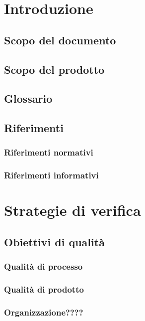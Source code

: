 \documentclass[a4paper, oneside, openany, dvipsnames, table]{article}
\begin{document}
\copertina{}

\newpage
\tableofcontents
\newpage


\section{Introduzione}
	\subsection{Scopo del documento}
		
	\subsection{Scopo del prodotto}
		
	\subsection{Glossario}
		
	\subsection{Riferimenti}
		\subsubsection{Riferimenti normativi}
			
		\subsubsection{Riferimenti informativi}
			
	\newpage
\section{Strategie di verifica}
	\subsection{Obiettivi di qualità}
		\subsubsection{Qualità di processo}
		\subsubsection{Qualità di prodotto}
		\subsubsection{Organizzazione????}
\end{document}
